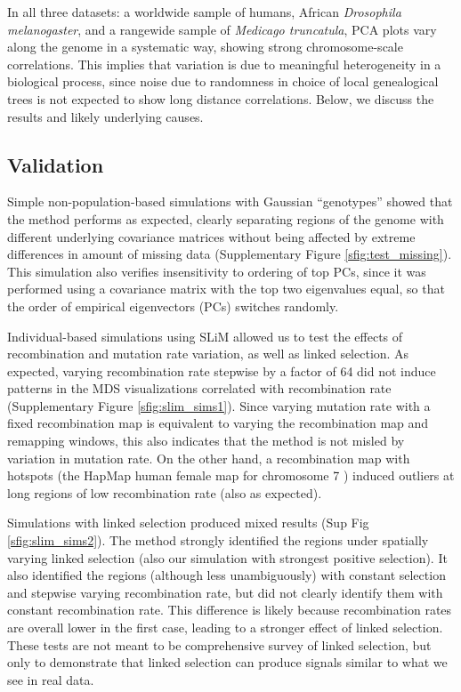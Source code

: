 \documentclass[11pt, oneside]{article}   	%
\newcommand\citep{\cite}
\newcommand{\SFigure}{Sup Fig }
\newcommand{\SFigure}{{Supplementary Figure }}
\renewcommand{\revpoint}[2]{\relax}
\renewcommand{\llabel}[1]{\relax}
\begin{document}
In all three datasets:
a worldwide sample of humans, African \textit{Drosophila melanogaster},
and a rangewide sample of \textit{Medicago truncatula},
PCA plots vary along the genome in a systematic way, showing strong chromosome-scale correlations.
This implies that variation is due to meaningful heterogeneity in a biological process,
since noise due to randomness in choice of local genealogical trees
is not expected to show long distance correlations. 
Below, we discuss the results and likely underlying causes.




\subsection{Validation}
\label{ss:validation}

Simple non-population-based simulations with Gaussian ``genotypes''
showed that the method performs as expected, clearly separating regions of the genome
with different underlying covariance matrices
without being affected by extreme differences in amount of missing data
(Supplementary Figure \ref{sfig:test_missing}).
This simulation also verifies insensitivity to ordering of top PCs,
since it was performed using a covariance matrix with the top two eigenvalues equal,  
so that the order of empirical eigenvectors (PCs) switches randomly.

Individual-based simulations using SLiM \citep{haller2017flexible} allowed us to test the effects
of recombination and mutation rate variation, as well as linked selection.
As expected, varying recombination rate stepwise by a factor of 64
did not induce patterns in the MDS visualizations correlated with recombination rate
(Supplementary Figure \ref{sfig:slim_sims1}).
\llabel{ll:test_recomb_rate}
Since varying mutation rate with a fixed recombination map
is equivalent to varying the recombination map and remapping windows,
this also indicates that the method is not misled by variation in mutation rate.
On the other hand,
a recombination map with hotspots
(the HapMap human female map for chromosome 7 \citep{hapmap2007second})
induced outliers at long regions of low recombination rate
(also as expected). \llabel{ll:hotspot_recomb}

Simulations with linked selection produced mixed results
(\SFigure \ref{sfig:slim_sims2}).
The method strongly identified the regions under spatially varying linked selection
(also our simulation with strongest positive selection). \revpoint{2}{2}
It also identified the regions (although less unambiguously)
with constant selection and stepwise varying recombination rate,
but did not clearly identify them with constant recombination rate.
This difference is likely because recombination rates are overall lower in the first case,
leading to a stronger effect of linked selection.
These tests are not meant to be comprehensive survey of linked selection,
but only to demonstrate that linked selection can produce signals similar to what we see in real data.
\end{document}
